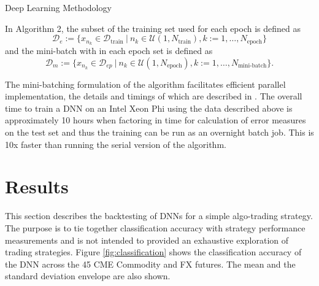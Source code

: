 \documentclass{article}
\newcommand{\be}{\begin{equation}}
\newcommand{\ee}{\end{equation}}
\begin{document}
\begin{algorithm}
\caption{{\sc Deep Learning Methodology}}
\label{algo:deep-learning}
\begin{algorithmic}[1]

 

 
		
			 
        		\EndFor
        		
			 
		\EndFor
	\EndFor
\EndFor
{}
\EndFor
{}
\end{algorithmic}
\end{algorithm}
In Algorithm 2,  the subset of the training set used for each epoch is defined as
\be
\mathcal{D}_e:=\{x_{n_k} \in \mathcal{D}_{\text{train}}~|~n_k\in\mathcal{U}(1,N_{\text{train}}), k:=1,\dots, N_{\text{epoch}}\}
\ee
and the mini-batch with in each epoch set is defined as
\be 
\mathcal{D}_m:=\{x_{n_k} \in \mathcal{D}_{ep}~|~ n_k\in\mathcal{U}(1,N_{\text{epoch}}), k:=1,\dots, N_{\text{mini-batch}}\}.
\ee

The mini-batching formulation of the algorithm facilitates efficient parallel implementation, the details and timings of which are described in \cite{dixon2015}.
The overall time to train a DNN on an Intel Xeon Phi using the data described above is approximately 10 hours when factoring in time for calculation of error measures on the test set and thus the training can be run as an overnight batch job.  This is 10x faster than running the serial version of the algorithm.



\section{Results} \label{sect:results}
This section describes the backtesting of DNNs for a simple algo-trading strategy. The purpose is to tie together classification accuracy with strategy performance measurements and is not intended to provided an exhaustive exploration of trading strategies. Figure \ref{fig:classification} shows the classification accuracy of the DNN across the 45 CME Commodity and FX futures. The mean and the standard deviation envelope are also shown.
\end{document}
